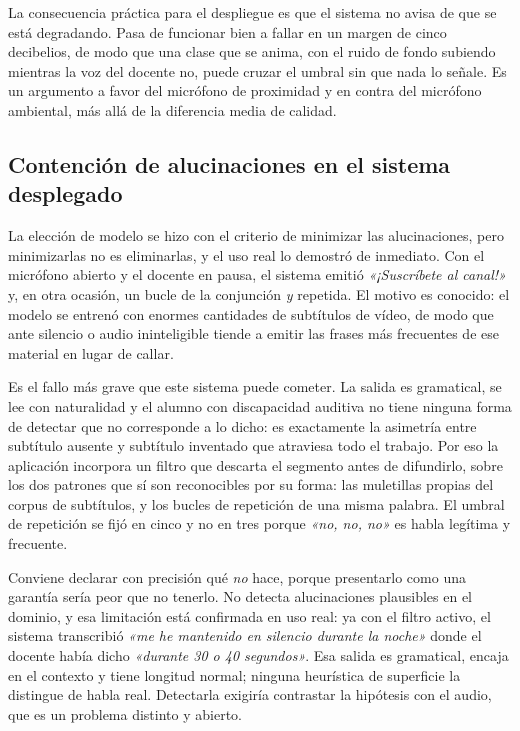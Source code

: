 La consecuencia práctica para el despliegue es que el sistema no avisa de que se está
degradando. Pasa de funcionar bien a fallar en un margen de cinco decibelios, de modo que
una clase que se anima, con el ruido de fondo subiendo mientras la voz del docente no,
puede cruzar el umbral sin que nada lo señale. Es un argumento a favor del micrófono de proximidad y en
contra del micrófono ambiental, más allá de la diferencia media de calidad.

\subsection{Contención de alucinaciones en el sistema desplegado}
\label{sec:filtro}

La elección de modelo se hizo con el criterio de minimizar las alucinaciones, pero
minimizarlas no es eliminarlas, y el uso real lo demostró de inmediato. Con el micrófono
abierto y el docente en pausa, el sistema emitió \emph{«¡Suscríbete al canal!»} y, en otra
ocasión, un bucle de la conjunción \emph{y} repetida. El motivo es conocido: el modelo se
entrenó con enormes cantidades de subtítulos de vídeo, de modo que ante silencio o audio
ininteligible tiende a emitir las frases más frecuentes de ese material en lugar de callar.

Es el fallo más grave que este sistema puede cometer. La salida es gramatical, se lee con
naturalidad y el alumno con discapacidad auditiva no tiene ninguna forma de detectar que no
corresponde a lo dicho: es exactamente la asimetría entre subtítulo ausente y subtítulo
inventado que atraviesa todo el trabajo. Por eso la aplicación incorpora un filtro que
descarta el segmento antes de difundirlo, sobre los dos patrones que sí son reconocibles por
su forma: las muletillas propias del corpus de subtítulos, y los bucles de repetición de una
misma palabra. El umbral de repetición se fijó en cinco y no en tres porque \emph{«no, no,
no»} es habla legítima y frecuente.

Conviene declarar con precisión qué \emph{no} hace, porque presentarlo como una garantía
sería peor que no tenerlo. No detecta alucinaciones plausibles en el dominio, y esa
limitación está confirmada en uso real: ya con el filtro activo, el sistema transcribió
\emph{«me he mantenido en silencio durante la noche»} donde el docente había dicho
\emph{«durante 30 o 40 segundos»}. Esa salida es gramatical, encaja en el contexto y tiene
longitud normal; ninguna heurística de superficie la distingue de habla real. Detectarla
exigiría contrastar la hipótesis con el audio, que es un problema distinto y abierto.

